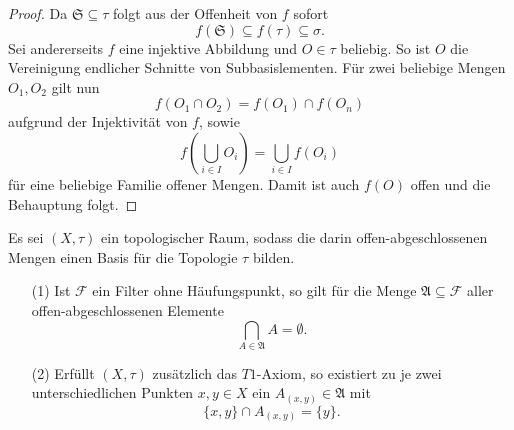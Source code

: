 \begin{proof}
  Da $\mathfrak{S} \subseteq \tau$ folgt aus der Offenheit von $f$ sofort 
  \begin{displaymath}
    f(\mathfrak{S}) \subseteq f(\tau) \subseteq \sigma.
  \end{displaymath}
  Sei andererseits $f$ eine injektive Abbildung und $O \in \tau$ beliebig.
  So ist $O$ die Vereinigung endlicher Schnitte von Subbasislementen.
  Für zwei beliebige Mengen $O_1,O_2$ gilt nun 
  \begin{displaymath}
    f(O_1 \cap O_2) = f(O_1) \cap f(O_n)
  \end{displaymath}
  aufgrund der Injektivität von $f$, sowie 
  \begin{displaymath}
    f \left(\bigcup_{i \in I} O_i \right) = \bigcup_{i \in I} f(O_i)
  \end{displaymath}
  für eine beliebige Familie offener Mengen.
  Damit ist auch $f(O)$ offen und die Behauptung folgt.
\end{proof}

\begin{lem}
  \label{lem:filterclusterpoint}
  Es sei $(X,\tau)$ ein topologischer Raum, sodass die darin offen-abgeschlossenen Mengen einen Basis für die Topologie $\tau$ bilden.

  \begin{itemize}
    \item[(1)] Ist $\mathcal{F}$ ein Filter ohne Häufungspunkt, so gilt für die Menge $\mathfrak{A} \subseteq \mathcal{F}$ aller offen-abgeschlossenen Elemente 
     \begin{displaymath}
       \bigcap_{A \in \mathfrak{A}} A = \emptyset.
     \end{displaymath}
   \item[(2)] Erfüllt $(X,\tau)$ zusätzlich das $T1$-Axiom, so existiert zu je zwei unterschiedlichen Punkten $x,y \in X$ ein $A_{(x,y)} \in \mathfrak{A}$ mit 
     \begin{displaymath}
       \{x,y\} \cap A_{(x,y)} = \{y\}.
     \end{displaymath}
  \end{itemize}
\end{lem}

